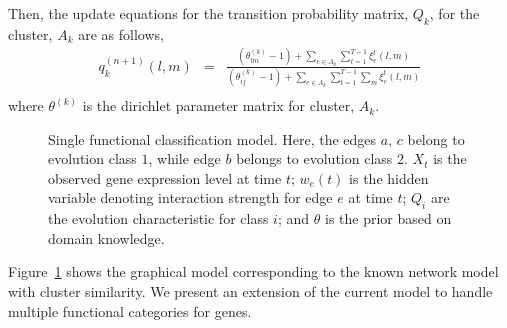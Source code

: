 \documentclass{bioinfo}
\begin{document}
\begin{methods}
Then, the update equations for the transition probability matrix,
$Q_k$, for the cluster, $A_k$ are as follows,
\begin{eqnarray}
  \label{eq:cluster_update}
  q_{k}^{(n+1)}(l, m)   &=& \frac{(\theta^{(k)}_{lm} -1) + \sum_{e \in A_k} \sum_{t=1}^{T-1} \xi^{t}_{e}(l,m)}{ (\theta^{(k)}_{ij} -1) + \sum_{e \in A_k} \sum_{t=1}^{T-1}
   \sum_{m} \xi^{t}_{e}(l,m)} \nonumber \\
\end{eqnarray}
where $\theta^{(k)}$ is the dirichlet parameter matrix for cluster,
$A_{k}$.
\begin{figure}[h]
  \centering
  \caption{Single functional classification model. Here, the
    edges $a, \,c$ belong to evolution class $1$, while edge $b$
    belongs to evolution class $2$. $X_{t}$ is the observed gene
    expression level at time $t$; $w_{e}(t)$ is the hidden variable
    denoting interaction strength for edge $e$ at time $t$; $Q_{i}$
    are the evolution characteristic for class $i$; and $\theta$ is
    the prior based on domain knowledge.}
  \label{fig:factorial}
\end{figure}


Figure~\ref{fig:factorial} shows the graphical model corresponding to
the known network model with cluster similarity. We present an
extension of the current model to handle multiple functional
categories for genes.
 

\end{methods}
\end{document}

